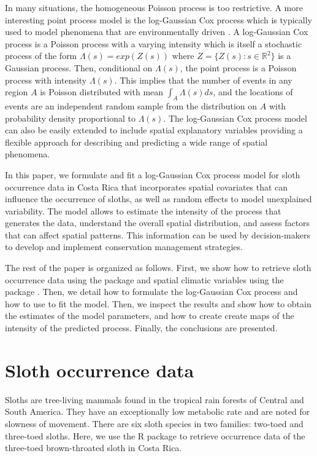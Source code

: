 In many situations, the homogeneous Poisson process is too restrictive.
A more interesting point process model is the log-Gaussian Cox process which is typically used to model phenomena that are environmentally driven
\citep{diggleetal13}.
A log-Gaussian Cox process is a Poisson process with a varying intensity which is itself a stochastic process of the form $\Lambda(s) = exp(Z(s))$ where $Z = \{Z(s): s \in \mathbb{R}^2\}$ is a Gaussian process.
Then, conditional on $\Lambda(s)$, the point process is a Poisson process with intensity $\Lambda(s)$.
This implies that the number of events in any region $A$ is Poisson distributed with mean
$\int_A \Lambda(s)ds$, and the locations of events are an independent random sample from the distribution on $A$ with probability density proportional to $\Lambda(s)$.
The log-Gaussian Cox process model can also be easily extended to include spatial explanatory variables providing a flexible approach for describing and predicting a wide range of spatial phenomena.


In this paper, we formulate and fit a log-Gaussian Cox process model for sloth occurrence data in Costa Rica that incorporates spatial covariates that can influence the occurrence of sloths, as well as random effects to model unexplained variability.
The model allows to estimate the intensity of the process that generates the data, understand the overall spatial distribution, and assess factors that can affect spatial patterns.
This information can be used by decision-makers to develop and implement conservation management strategies.


The rest of the paper is organized as follows.
First, we show how to retrieve sloth occurrence data using the  package \citep{Rspocc} and spatial climatic variables using the  package \citep{Rraster}.
Then, we detail how to formulate the log-Gaussian Cox process and how to use  to fit the model.
Then, we inspect the results and show how to obtain the estimates of the model parameters, and how to create create maps of the intensity of the predicted process. Finally, the conclusions are presented.


\section{Sloth occurrence data}





Sloths are tree-living mammals found in the tropical rain forests of Central and South America. They have an exceptionally low metabolic rate and are noted for slowness of movement. There are six sloth species in two families: two-toed and three-toed sloths.
Here, we use the R package  \citep{Rspocc} to retrieve occurrence data of the three-toed brown-throated sloth in Costa Rica.

